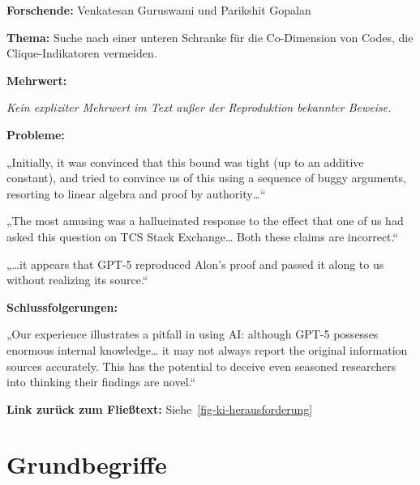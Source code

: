 \documentclass[
  ngerman,
  letterpaper,
  DIV=11]{scrreprt}
\begin{document}
\begin{tcolorbox}[enhanced jigsaw, left=2mm, bottomrule=.15mm, arc=.35mm, rightrule=.15mm, colframe=quarto-callout-note-color-frame, coltitle=black, colback=white, toprule=.15mm, toptitle=1mm, colbacktitle=quarto-callout-note-color!10!white, title=\textcolor{quarto-callout-note-color}{\faInfo}\hspace{0.5em}{Informatik / Clique-avoiding Codes (Warnbeispiel)}, opacitybacktitle=0.6, leftrule=.75mm, bottomtitle=1mm, titlerule=0mm, opacityback=0, breakable]

\textbf{Forschende:} Venkatesan Guruswami und Parikshit Gopalan

\textbf{Thema:} Suche nach einer unteren Schranke für die Co-Dimension
von Codes, die Clique-Indikatoren vermeiden.

\textbf{Mehrwert:}

\emph{Kein expliziter Mehrwert im Text außer der Reproduktion bekannter
Beweise.}

\textbf{Probleme:}

„Initially, it was convinced that this bound was tight (up to an
additive constant), and tried to convince us of this using a sequence of
buggy arguments, resorting to linear algebra and proof by
authority\ldots``

„The most amusing was a hallucinated response to the effect that one of
us had asked this question on TCS Stack Exchange\ldots{} Both these
claims are incorrect.``

„\ldots it appears that GPT-5 reproduced Alon's proof and passed it
along to us without realizing its source.``

\textbf{Schlussfolgerungen:}

„Our experience illustrates a pitfall in using AI: although GPT-5
possesses enormous internal knowledge\ldots{} it may not always report
the original information sources accurately. This has the potential to
deceive even seasoned researchers into thinking their findings are
novel.``

\end{tcolorbox}

\textbf{Link zurück zum Fließtext:} Siehe~\ref{fig-ki-herausforderung}


\chapter{Grundbegriffe}\label{sec-grundbegriffe}
\end{document}
